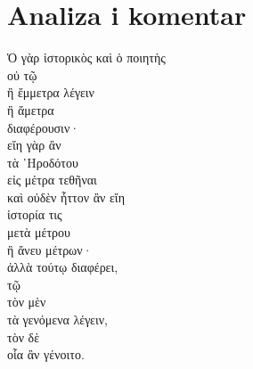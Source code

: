 \section*{Analiza i komentar}


{\large
\begin{greek}
\noindent Ὁ γὰρ ἱστορικὸς καὶ ὁ ποιητὴς \\
\tabto{2em} οὐ τῷ\\
\tabto{4em} ἢ ἔμμετρα λέγειν \\
\tabto{4em} ἢ ἄμετρα \\
\tabto{2em} διαφέρουσιν· \\

\noindent εἴη γὰρ ἂν \\
\tabto{2em} τὰ ῾Ηροδότου \\
\tabto{2em} εἰς μέτρα τεθῆναι \\
καὶ οὐδὲν ἧττον ἂν εἴη \\
\tabto{2em} ἱστορία τις \\
\tabto{4em} μετὰ μέτρου \\
\tabto{4em} ἢ ἄνευ μέτρων· \\
ἀλλὰ τούτῳ διαφέρει, \\
\tabto{2em} τῷ \\
\tabto{4em} τὸν μὲν \\
\tabto{6em} τὰ γενόμενα λέγειν, \\
\tabto{4em} τὸν δὲ \\
\tabto{6em} οἷα ἂν γένοιτο.\\

\end{greek}
}

